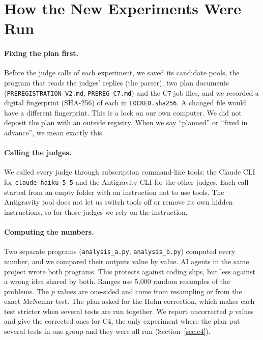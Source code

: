 \documentclass[10pt,twocolumn]{article}
\begin{document}
\section{How the New Experiments Were Run}
\label{sec:design}
\paragraph{Fixing the plan first.} Before the judge calls of each experiment, we saved its candidate pools, the program that reads the judges' replies (the parser), two plan documents (\texttt{PREREGISTRATION\_V2.md}, \texttt{PREREG\_C7.md}) and the C7 job files, and we recorded a digital fingerprint (SHA-256) of each in \texttt{LOCKED.sha256}. A changed file would have a different fingerprint. This is a lock on our own computer. We did not deposit the plan with an outside registry. When we say ``planned'' or ``fixed in advance'', we mean exactly this.

\paragraph{Calling the judges.} We called every judge through subscription command-line tools: the Claude CLI for \texttt{claude-haiku-5-5} and the Antigravity CLI for the other judges. Each call started from an empty folder with an instruction not to use tools. The Antigravity tool does not let us switch tools off or remove its own hidden instructions, so for those judges we rely on the instruction.

\paragraph{Computing the numbers.} Two separate programs (\texttt{analysis\_a.py}, \texttt{analysis\_b.py}) computed every number, and we compared their outputs value by value. AI agents in the same project wrote both programs. This protects against coding slips, but less against a wrong idea shared by both. Ranges use 5,000 random resamples of the problems. The $p$ values are one-sided and come from resampling or from the exact McNemar test. The plan asked for the Holm correction, which makes each test stricter when several tests are run together. We report uncorrected $p$ values and give the corrected ones for C4, the only experiment where the plan put several tests in one group and they were all run (Section~\ref{sec:c4}).
\end{document}

